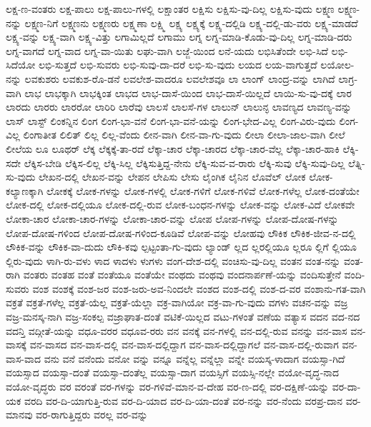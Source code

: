 {ಲಕ್ಷ-ಣ-ವಂತರು
ಲಕ್ಷ-ಪಾಲು
ಲಕ್ಷ-ಪಾಲು-ಗಳಲ್ಲಿ
ಲಕ್ಷಾಂತರ
ಲಕ್ಷಿಸು
ಲಕ್ಷಿಸು-ವು-ದಿಲ್ಲ
ಲಕ್ಷಿಸು-ವುದು
ಲಕ್ಷ್ಮಣ
ಲಕ್ಷ್ಮಣ-ನನ್ನು
ಲಕ್ಷ್ಮಣ-ನಿಗೆ
ಲಕ್ಷ್ಮಣನು
ಲಕ್ಷ್ಮಣರು
ಲಕ್ಷ್ಮಣಾ
ಲಕ್ಷ್ಮಿ
ಲಕ್ಷ್ಯ
ಲಕ್ಷ್ಯಕ್ಕೆ
ಲಕ್ಷ್ಯ-ದಲ್ಲಿಡಿ
ಲಕ್ಷ್ಯ-ದಲ್ಲಿ-ಡು-ವರು
ಲಕ್ಷ್ಯ-ಮಾಡದೆ
ಲಕ್ಷ್ಯ-ವನ್ನು
ಲಕ್ಷ್ಯ-ವಾಗಿ
ಲಕ್ಷ್ಯ-ವಿತ್ತು
ಲಗಾಮಿಲ್ಲದೆ
ಲಗಾಮು
ಲಗ್ನ
ಲಗ್ನ-ಮಾಡಿ-ಕೊಡು-ವು-ದಿಲ್ಲ
ಲಗ್ನ-ಮಾಡಿ-ದರು
ಲಗ್ನ-ವಾಗದೆ
ಲಗ್ನ-ವಾದ
ಲಗ್ನ-ವಾ-ಯಿತು
ಲಘು-ವಾಗಿ
ಲಜ್ಜೆ-ಯಿಂದ
ಲನೆ-ಯದು
ಲಭಿಸಿತೆಂದೇ
ಲಭಿ-ಸಿದೆ
ಲಭಿ-ಸಿದೆಯೋ
ಲಭಿ-ಸುತ್ತದೆ
ಲಭಿ-ಸುವರು
ಲಭಿ-ಸುವು-ದಾ-ದರೆ
ಲಭಿ-ಸು-ವುದು
ಲಯದ
ಲಯ-ವಾಗುತ್ತದೆ
ಲಯೋಲ-ನನ್ನು
ಲವಕುಶರು
ಲವಕುಶ-ರೊ-ಡನೆ
ಲವಲೇಶ-ವಾದರೂ
ಲವಲೇಶವೂ
ಲಾ
ಲಾಂಗ್
ಲಾಂದ್ರ-ವನ್ನು
ಲಾಗಿದೆ
ಲಾಗ್ರ-ವಾಗಿ
ಲಾಭ
ಲಾಭಕ್ಕಾಗಿ
ಲಾಭಕ್ಕಿಂತ
ಲಾಭದ
ಲಾಭ-ದಾಸೆ-ಯಿಂದ
ಲಾಭ-ದಾಸೆ-ಯಿಲ್ಲದೆ
ಲಾಯಿ-ಸು-ವು-ದಕ್ಕೆ
ಲಾರ
ಲಾರದು
ಲಾರರು
ಲಾರರೋ
ಲಾರಿರಿ
ಲಾರೆವು
ಲಾಲಸೆ
ಲಾಲಸೆ-ಗಳ
ಲಾಲುನ್
ಲಾಲುನ್ಳ
ಲಾವಣ್ಯದ
ಲಾವಣ್ಯ-ವನ್ನು
ಲಾಸ್
ಲಾಸ್ಟ್
ಲಿಂಕನ್ನಿನ
ಲಿಂಗ
ಲಿಂಗ-ಭಾ-ವನೆ
ಲಿಂಗ-ಭಾ-ವನೆ-ಯನ್ನು
ಲಿಂಗ-ಭೇದ-ವಿಲ್ಲ
ಲಿಂಗ-ವಿರು-ವುದು
ಲಿಂಗ-ವಿಲ್ಲ
ಲಿಂಗಾತೀತ
ಲಿಲಿತ್
ಲಿಲ್ಲ
ಲಿಲ್ಲ-ವೆಂದು
ಲೀನ-ವಾಗಿ
ಲೀನ-ವಾ-ಗು-ವುದು
ಲೀಲಾ
ಲೀಲಾ-ಜಾಲ-ವಾಗಿ
ಲೀಲೆ
ಲೀಲೆಯ
ಲೂ
ಲೂಥರ್
ಲೆಕ್ಕ
ಲೆಕ್ಕಕ್ಕೆ-ತಾ-ರದೆ
ಲೆಕ್ಕಾ-ಚಾರ
ಲೆಕ್ಕಾ-ಚಾರದ
ಲೆಕ್ಕಾ-ಚಾರ-ವೆಲ್ಲ
ಲೆಕ್ಕಾ-ಚಾರ-ಹಾಕಿ
ಲೆಕ್ಕಿ-ಸದೇ
ಲೆಕ್ಕಿಸ-ಬೇಡಿ
ಲೆಕ್ಕಿಸ-ಲಿಲ್ಲ
ಲೆಕ್ಕಿ-ಸಿಲ್ಲ
ಲೆಕ್ಕಿಸುತ್ತಿದ್ದ-ನೇನು
ಲೆಕ್ಕಿ-ಸುವ-ವ-ರಾರು
ಲೆಕ್ಕಿ-ಸುವು
ಲೆಕ್ಕಿ-ಸುವು-ದಿಲ್ಲ
ಲೆತ್ನಿ-ಸು-ವುದು
ಲೇಖನ-ದಲ್ಲಿ
ಲೇಖನ-ವನ್ನು
ಲೇಪನ
ಲೇಪಿಸು
ಲೇಸು
ಲೈಂಗಿಕ
ಲೈನಿನ
ಲೊವೆಲ್
ಲೋಕ
ಲೋಕ-ಕಲ್ಯಾಣಕ್ಕಾಗಿ
ಲೋಕಕ್ಕೆ
ಲೋಕ-ಗಳನ್ನು
ಲೋಕ-ಗಳಲ್ಲಿ
ಲೋಕ-ಗಳಿಗೆ
ಲೋಕ-ಗಳಿವೆ
ಲೋಕ-ಗಳೆಲ್ಲ
ಲೋಕ-ದಂತೆಯೇ
ಲೋಕ-ದಲ್ಲಿ
ಲೋಕ-ದಲ್ಲಿಯೂ
ಲೋಕ-ದಲ್ಲಿ-ರುವ
ಲೋಕ-ಬಂಧನ-ಗಳನ್ನು
ಲೋಕ-ವನ್ನು
ಲೋಕ-ವಿದೆ
ಲೋಕವೇ
ಲೋಕಾ-ಚಾರ
ಲೋಕಾ-ಚಾರ-ಗಳನ್ನು
ಲೋಕಾ-ಚಾರ-ವನ್ನು
ಲೋಪ
ಲೋಪ-ಗಳನ್ನು
ಲೋಪ-ದೋಷ-ಗಳನ್ನು
ಲೋಪ-ದೋಷ-ಗಳಿಂದ
ಲೋಪ-ದೋಷ-ಗಳಿಂದ-ಕೂಡಿವೆ
ಲೋಪ-ವನ್ನು
ಲೋಹವು
ಲೌಕಿಕ
ಲೌಕಿಕ-ಜೀವ-ನ-ದಲ್ಲಿ
ಲೌಕಿಕ-ವನ್ನು
ಲೌಕಿಕ-ವಾ-ದುದು
ಲೌಕಿ-ಕವು
ಲ್ಪಟ್ಟಂತಾ-ಗು-ವುದು
ಲ್ಯಾಂಡ್
ಲ್ಲದ
ಲ್ಲರಲ್ಲಿಯೂ
ಲ್ಲರೂ
ಲ್ಲಿಗೆ
ಲ್ಲಿಯೂ
ಲ್ಲಿರು-ವುದು
ಳಾಗಿ-ರು-ವಳು
ಳಾದ
ಳಾದಳು
ಳುಗಳು
ವಂಗ-ದೇಶ-ದಲ್ಲಿ
ವಂಚಿಸು-ವು-ದಿಲ್ಲ
ವಂತನ
ವಂತ-ನನ್ನು
ವಂತ-ರಾಗಿ
ವಂತರು
ವಂತಹ
ವಂತೆ
ವಂತೆಯೂ
ವಂತೆಯೇ
ವಂಥದು
ವಂಥವು
ವಂದನಾರ್ಪಣೆ-ಯನ್ನು
ವಂದಿಸುತ್ತೇನೆ
ವಂದಿ-ಸುವರು
ವಂಶ
ವಂಶಕ್ಕೆ
ವಂಶ-ಜರ
ವಂಶ-ಜರು-ಅವ-ನಿಂದಲೇ
ವಂಶದ
ವಂಶ-ದಲ್ಲಿ
ವಂಶ-ದ-ವರ
ವಂಶಾನು-ಗತ-ವಾಗಿ
ವಕ್ರತೆ
ವಕ್ರತೆ-ಗಳೆಲ್ಲ
ವಕ್ರತೆ-ಯೆಲ್ಲ
ವಕ್ರತೆ-ಯೆಲ್ಲಾ
ವಕ್ರ-ವಾಗಿಯೋ
ವಕ್ರ-ವಾ-ಗು-ವುದು
ವಗಳು
ವಚನ-ವನ್ನು
ವಜ್ರ
ವಜ್ರ-ಮನಸ್ಕ-ನಾಗಿ
ವಜ್ರ-ಸಂಕಲ್ಪ
ವಜ್ರಾಘಾತ-ದಂತೆ
ವಟಿಕೆ-ಯಿಲ್ಲದ
ವಟು-ಗಳಂತೆ
ವಣೆಯ
ವತ್ಯಾಸ
ವದನ
ವದ-ನದ
ವದನ್ತಿ
ವದ್ಗೀತೆ-ಯನ್ನು
ವಧೂ-ವರರ
ವಧೂವ-ರರು
ವನ
ವನಕ್ಕೆ
ವನ-ಗಳಲ್ಲಿ
ವನ-ದಲ್ಲಿ-ರುವ
ವನನ್ನು
ವನ-ವಾಸ
ವನ-ವಾಸಕ್ಕೆ
ವನ-ವಾಸದ
ವನ-ವಾಸ-ದಲ್ಲಿ
ವನ-ವಾಸ-ದಲ್ಲಿದ್ದಾಗ
ವನ-ವಾಸ-ದಲ್ಲಿದ್ದಾಗಲೆ
ವನ-ವಾಸ-ದಲ್ಲಿ-ರುವಾಗ
ವನ-ವಾಸ-ವಾದ
ವನು
ವನೆ
ವನೆಂದು
ವನೋ
ವನ್ನು
ವನ್ನೂ
ವನ್ನೆಲ್ಲ
ವನ್ನೆಲ್ಲಾ
ವನ್ನೇ
ವಯಸ್ಕ-ಳಾದಾಗ
ವಯಸ್ಸಾ-ಗಿದೆ
ವಯಸ್ಸಾದ
ವಯಸ್ಸಾ-ದಂತೆ
ವಯಸ್ಸಾ-ದಂತೆಲ್ಲ
ವಯಸ್ಸಾ-ದಾಗ
ವಯಸ್ಸಿಗೆ
ವಯಸ್ಸಿ-ನಲ್ಲೇ
ವಯೋ-ವೃದ್ಧ-ನಾದ
ವಯೋ-ವೃದ್ಧರು
ವರ
ವರಂತೆ
ವರ-ಗಳನ್ನು
ವರ-ಗಳಿವೆ-ಮಾನ-ವ-ದೇಹ
ವರ-ಣ-ದಲ್ಲಿ
ವರ-ದಕ್ಷಿಣೆ-ಯನ್ನು
ವರ-ದಾ-ಯಕ
ವರದಿ
ವರ-ದಿ-ಯಾಗುತ್ತಿ-ರುವ
ವರ-ದಿ-ಯಾದ
ವರ-ದಿ-ಯಾ-ದಂತೆ
ವರ-ನನ್ನು
ವರ-ನೆಂದು
ವರಪ್ರ-ದಾನ
ವರ-ಮಾನವು
ವರ-ರಾಗುತ್ತಿದ್ದರು
ವರಲ್ಲ
ವರ-ವನ್ನು
}

